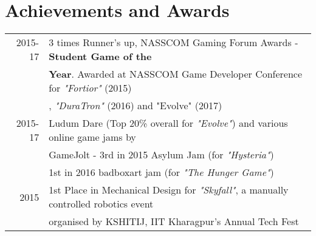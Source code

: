 \documentclass[]{rudra-resume-openfont}
\begin{document}
\begin{minipage}[t]{0.66\textwidth}

\section{Achievements and Awards} 

\begin{tabular}{rl}
2015-17	     & 3 times Runner's up, NASSCOM Gaming Forum Awards - \textbf{Student Game of the} \\ & \textbf{Year}. Awarded at NASSCOM Game Developer Conference for \textit{"Fortior"} (2015) \\ & , \textit{"DuraTron"} (2016) and {"Evolve"} (2017)\\

2015-17	     & Ludum Dare (Top 20\% overall for \textit{"Evolve"}) and various online game jams by \\ & GameJolt - 3rd in 2015 Asylum Jam (for \textit{"Hysteria"})\\ & 1st in 2016 badboxart jam (for \textit{"The Hunger Game"})\\

2015      & 1st Place in Mechanical Design for \textit{"Skyfall"}, a manually controlled robotics event\\ & organised by KSHITIJ, IIT Kharagpur's Annual Tech Fest\\
\end{tabular}

\sectionsep


\end{minipage}
\end{document}
